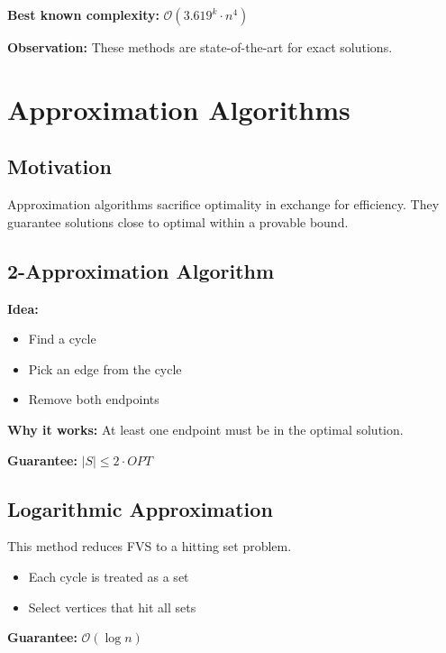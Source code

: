 \documentclass[10pt,a4paper]{report}
\theoremstyle{definition}
\newcommand{\fvs}{\textsc{FVS}}
\newcommand{\bigO}[1]{\mathcal{O}\!\left(#1\right)}
\begin{document}
\textbf{Best known complexity:} $\bigO{3.619^k \cdot n^4}$

\textbf{Observation:} These methods are state-of-the-art for exact solutions.

\section{Approximation Algorithms}

\subsection{Motivation}

Approximation algorithms sacrifice optimality in exchange for efficiency.
They guarantee solutions close to optimal within a provable bound.

\subsection{2-Approximation Algorithm}

\textbf{Idea:}
\begin{itemize}
  \item Find a cycle
  \item Pick an edge from the cycle
  \item Remove both endpoints
\end{itemize}

\textbf{Why it works:} At least one endpoint must be in the optimal solution.

\textbf{Guarantee:} $|S| \leq 2 \cdot OPT$

\subsection{Logarithmic Approximation}

This method reduces \fvs{} to a hitting set problem.

\begin{itemize}
  \item Each cycle is treated as a set
  \item Select vertices that hit all sets
\end{itemize}

\textbf{Guarantee:} $\mathcal{O}(\log n)$

\end{document}

